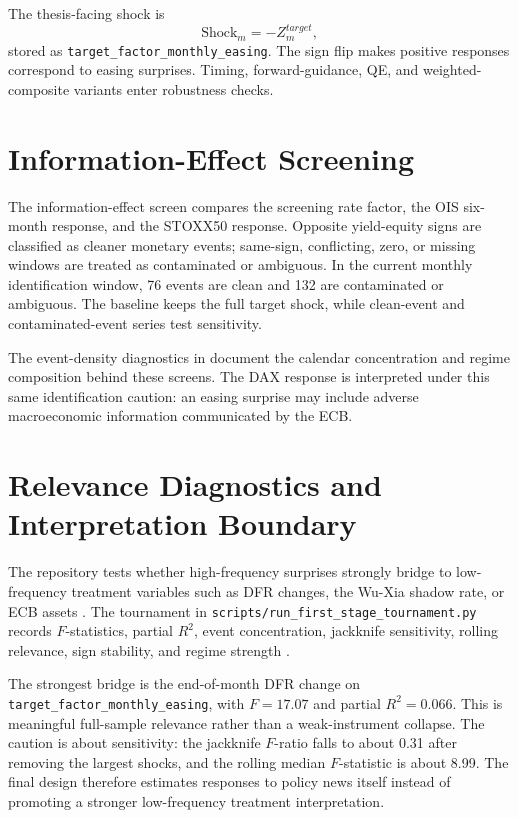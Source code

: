 The thesis-facing shock is
\begin{equation}
  \mathrm{Shock}_{m}
  =
  - Z^{target}_{m},
  \label{eq:target-easing-sign}
\end{equation}
stored as \nolinkurl{target_factor_monthly_easing}. The sign flip makes positive responses correspond to easing surprises. Timing, forward-guidance, QE, and weighted-composite variants enter robustness checks.

\section{Information-Effect Screening}

The information-effect screen compares the screening rate factor, the OIS six-month response, and the STOXX50 response. Opposite yield-equity signs are classified as cleaner monetary events; same-sign, conflicting, zero, or missing windows are treated as contaminated or ambiguous. In the current monthly identification window, 76 events are clean and 132 are contaminated or ambiguous. The baseline keeps the full target shock, while clean-event and contaminated-event series test sensitivity.

The event-density diagnostics in  document the calendar concentration and regime composition behind these screens. The DAX response is interpreted under this same identification caution: an easing surprise may include adverse macroeconomic information communicated by the ECB.

\section{Relevance Diagnostics and Interpretation Boundary}

The repository tests whether high-frequency surprises strongly bridge to low-frequency treatment variables such as DFR changes, the Wu-Xia shadow rate, or ECB assets \parencite{MertensRavn2013,StockWatson2018}. The tournament in \nolinkurl{scripts/run_first_stage_tournament.py} records \(F\)-statistics, partial \(R^2\), event concentration, jackknife sensitivity, rolling relevance, sign stability, and regime strength \parencite{StockYogo2005}.

The strongest bridge is the end-of-month DFR change on \nolinkurl{target_factor_monthly_easing}, with \(F=17.07\) and partial \(R^2=0.066\). This is meaningful full-sample relevance rather than a weak-instrument collapse. The caution is about sensitivity: the jackknife \(F\)-ratio falls to about 0.31 after removing the largest shocks, and the rolling median \(F\)-statistic is about 8.99. The final design therefore estimates responses to policy news itself instead of promoting a stronger low-frequency treatment interpretation.

